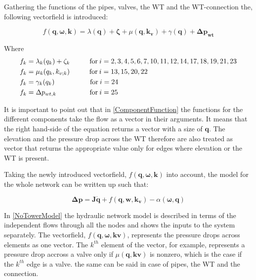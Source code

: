 Gathering the functions of the pipes, valves, the WT and the WT-connection the, following vectorfield is introduced:

\begin{equation}
  f(\bm{q}, \bm{\omega}, \bm{k}) = \lambda(\bm{q}) + \bm{\zeta} + \mu(\bm{q}, \bm{k_v}) + \gamma (\bm{q}) + \bm{\Delta p_{wt}}
  \label{ComponentFunction}
\end{equation}

Where\\
\begin{align}
f_k &= \lambda_k (q_k) + \zeta_k  \hskip 1cm  \text{for}\: i = 2,3,4,5,6,7,10,11,12,14,17,18,19,21,23 \\
f_k &= \mu_k (q_k, k_{v;k})  \hspace{1cm} \text{for}\:i = 13,15,20,22\\
f_k &= \gamma_k (q_k)  \hspace{1.8cm} \text{for}\: i = 24 \\
f_k &= \Delta p_{wt,k}  \hspace{1.7cm} \text{for}\:i = 25
\end{align}

It is important to point out that in \eqref{ComponentFunction} the functions for the different components take the flow as a vector in their arguments. It means that the right hand-side of the equation returns a vector with a size of $\bm{q}$. The elevation and the pressure drop across the WT therefore are also treated as vector that returns the appropriate value only for edges where elevation or the WT is present. 

Taking the newly introduced vectorfield, $f(\bm{q}, \bm{\omega}, \bm{k})$ into account, the model for the whole network can be written up such that:

\begin{equation}
  \bm{\Delta p} =  \bm{J} \bm{\dot{q}} + f(\bm{q}, \bm{w}, \bm{k_v}) - \alpha (\bm{\omega},\bm{q})
  \label{NoTowerModel}
\end{equation}

In \eqref{NoTowerModel} the hydraulic network model is described in terms of the independent flows through all the nodes and shows the inputs to the system separately. The vectorfield, $f(\bm{q}, \bm{\omega}, \bm{kv})$, represents the pressure drops across elements as one vector. The $k^{th}$ element of the vector, for example, represents a pressure drop accross a valve only if $\mu(\bm{q},\bm{kv})$ is nonzero, which is the case if the $k^{th}$ edge is a valve. the same can be said in case of pipes, the WT and the connection. 

